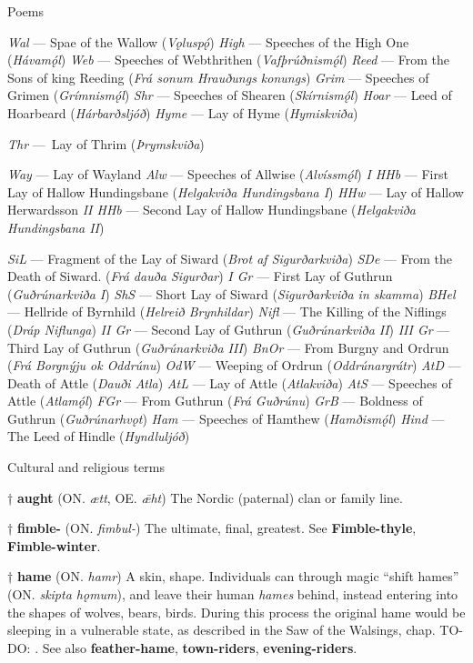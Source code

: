 Poems

\emph{Wal} — Spae of the Wallow (\emph{Vǫluspǫ́})
\emph{High} — Speeches of the High One (\emph{Hávamǫ́l})
\emph{Web} — Speeches of Webthrithen (\emph{Vafþrúðnismǫ́l})
\emph{Reed} — From the Sons of king Reeding (\emph{Frá sonum Hrauðungs konungs})
\emph{Grim} — Speeches of Grimen (\emph{Grímnismǫ́l})
\emph{Shr} — Speeches of Shearen (\emph{Skírnismǫ́l})
\emph{Hoar} — Leed of Hoarbeard (\emph{Hárbarðsljóð})
\emph{Hyme} — Lay of Hyme (\emph{Hymiskviða})

\emph{Thr} — Lay of Thrim (\emph{Þrymskviða})

\emph{Way} — Lay of Wayland
\emph{Alw} — Speeches of Allwise (\emph{Alvíssmǫ́l})
\emph{I HHb} — First Lay of Hallow Hundingsbane (\emph{Helgakviða Hundingsbana I})
\emph{HHw} — Lay of Hallow Herwardsson
\emph{II HHb} — Second Lay of Hallow Hundingsbane (\emph{Helgakviða Hundingsbana II})

\emph{SiL} — Fragment of the Lay of Siward (\emph{Brot af Sigurðarkviða})
\emph{SDe} — From the Death of Siward. (\emph{Frá dauða Sigurðar})
\emph{I Gr} — First Lay of Guthrun (\emph{Guðrúnarkviða I})
\emph{ShS} — Short Lay of Siward (\emph{Sigurðarkviða in skamma})
\emph{BHel} — Hellride of Byrnhild (\emph{Helreið Brynhildar})
\emph{Nifl} — The Killing of the Niflings (\emph{Dráp Niflunga})
\emph{II Gr} — Second Lay of Guthrun (\emph{Guðrúnarkviða II})
\emph{III Gr} — Third Lay of Guthrun (\emph{Guðrúnarkviða III})
\emph{BnOr} — From Burgny and Ordrun (\emph{Frá Borgnýju ok Oddrúnu})
\emph{OdW} — Weeping of Ordrun (\emph{Oddrúnargrátr})
\emph{AtD} — Death of Attle (\emph{Dauði Atla})
\emph{AtL} — Lay of Attle (\emph{Atlakviða})
\emph{AtS} — Speeches of Attle (\emph{Atlamǫ́l})
\emph{FGr} — From Guthrun (\emph{Frá Guðrúnu})
\emph{GrB} — Boldness of Guthrun (\emph{Guðrúnarhvǫt})
\emph{Ham} — Speeches of Hamthew (\emph{Hamðismǫ́l})
\emph{Hind} — The Leed of Hindle (\emph{Hyndluljóð})



Cultural and religious terms

† \textbf{aught} (ON. \emph{ætt}, OE. \emph{ǣht})
 The Nordic (paternal) clan or family line.

† \textbf{fimble-} (ON. \emph{fimbul-})
 The ultimate, final, greatest. See \textbf{Fimble-thyle}, \textbf{Fimble-winter}.

† \textbf{hame} (ON. \emph{hamr})
 A skin, shape. Individuals can through magic “shift hames” (ON. \emph{skipta hǫmum}), and leave their human \emph{hames} behind, instead entering into the shapes of wolves, bears, birds. During this process the original hame would be sleeping in a vulnerable state, as described in the Saw of the Walsings, chap. TO-DO: . See also \textbf{feather-hame}, \textbf{town-riders}, \textbf{evening-riders}.

